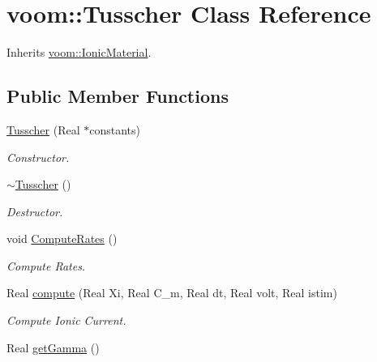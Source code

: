 \hypertarget{classvoom_1_1_tusscher}{
\section{voom::Tusscher Class Reference}
\label{classvoom_1_1_tusscher}
}


Inherits \hyperlink{classvoom_1_1_ionic_material}{voom::IonicMaterial}.\subsection*{Public Member Functions}
\begin{DoxyCompactItemize}
\item 
\hyperlink{classvoom_1_1_tusscher_a8ee053f384729caad43bea1f9b2fcd94}{Tusscher} (Real $\ast$constants)
\begin{DoxyCompactList}\small\item\em Constructor. \item\end{DoxyCompactList}\item 
\hypertarget{classvoom_1_1_tusscher_a686f9c8869ba6aaa021cfe3a3e8cac17}{
\hyperlink{classvoom_1_1_tusscher_a686f9c8869ba6aaa021cfe3a3e8cac17}{$\sim$Tusscher} ()}
\label{classvoom_1_1_tusscher_a686f9c8869ba6aaa021cfe3a3e8cac17}

\begin{DoxyCompactList}\small\item\em Destructor. \item\end{DoxyCompactList}\item 
\hypertarget{classvoom_1_1_tusscher_a37dc866b19306f6360fba588fb503448}{
void \hyperlink{classvoom_1_1_tusscher_a37dc866b19306f6360fba588fb503448}{ComputeRates} ()}
\label{classvoom_1_1_tusscher_a37dc866b19306f6360fba588fb503448}

\begin{DoxyCompactList}\small\item\em Compute Rates. \item\end{DoxyCompactList}\item 
Real \hyperlink{classvoom_1_1_tusscher_a6ca3b7ba35dc82631a371d248fe5749b}{compute} (Real Xi, Real C\_\-m, Real dt, Real volt, Real istim)
\begin{DoxyCompactList}\small\item\em Compute Ionic Current. \item\end{DoxyCompactList}\item 
\hypertarget{classvoom_1_1_tusscher_a1c3c2dd28860736ebeb0f602a6b8caa8}{
Real \hyperlink{classvoom_1_1_tusscher_a1c3c2dd28860736ebeb0f602a6b8caa8}{getGamma} ()}
\label{classvoom_1_1_tusscher_a1c3c2dd28860736ebeb0f602a6b8caa8}


\end{DoxyCompactItemize}
